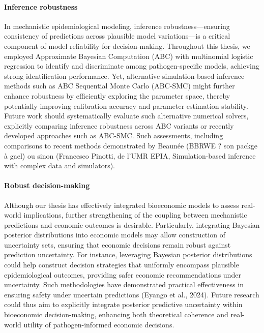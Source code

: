 \paragraph{Inference robustness} In mechanistic epidemiological modeling, inference robustness—ensuring consistency of predictions across plausible model variations—is a critical component of model reliability for decision-making. Throughout this thesis, we employed Approximate Bayesian Computation (ABC) with multinomial logistic regression to identify and discriminate among pathogen-specific models, achieving strong identification performance. Yet, alternative simulation-based inference methods such as ABC Sequential Monte Carlo (ABC-SMC) might further enhance robustness by efficiently exploring the parameter space, thereby potentially improving calibration accuracy and parameter estimation stability. Future work should systematically evaluate such alternative numerical solvers, explicitly comparing inference robustness across ABC variants or recently developed approaches such as ABC-SMC. Such assessments, including comparisons to recent methods demonstrated by Beaunée (BBRWE ? son packge à gael) ou sinon (Francesco Pinotti, de l'UMR EPIA, Simulation-based inference with complex data and simulators).

\paragraph{Robust decision-making} Although our thesis has effectively integrated bioeconomic models to assess real-world implications, further strengthening of the coupling between mechanistic predictions and economic outcomes is desirable. Particularly, integrating Bayesian posterior distributions into economic models may allow construction of uncertainty sets, ensuring that economic decisions remain robust against prediction uncertainty. For instance, leveraging Bayesian posterior distributions could help construct decision strategies that uniformly encompass plausible epidemiological outcomes, providing safer economic recommendations under uncertainty. Such methodologies have demonstrated practical effectiveness in ensuring safety under uncertain predictions (Eyango et al., 2024). Future research could thus aim to explicitly integrate posterior predictive uncertainty within bioeconomic decision-making, enhancing both theoretical coherence and real-world utility of pathogen-informed economic decisions.

